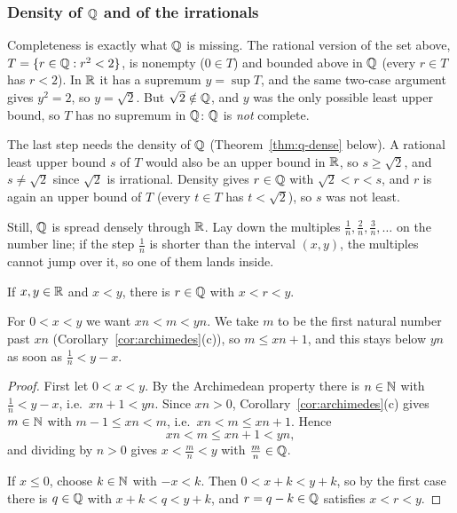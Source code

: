 \subsubsection*{Density of \texorpdfstring{$\Q$}{Q} and of the irrationals}
Completeness is exactly what $\Q$ is missing. The rational version of the
set above, $T = \{r \in \mathbb{Q} : r^2 < 2\}$, is nonempty ($0 \in T$) and bounded
above in $\Q$ (every $r \in T$ has $r < 2$). In $\mathbb{R}$ it has a supremum
$y = \sup T$, and the same two-case argument gives $y^2 = 2$, so
$y = \sqrt{2}$. But $\sqrt{2} \notin \mathbb{Q}$, and $y$ was the only possible
least upper bound, so $T$ has no supremum in $\Q$: $\Q$ is \emph{not}
complete.
\begin{own}
  The last step needs the density of $\Q$ (Theorem~\ref{thm:q-dense} below).
  A rational least upper bound $s$ of $T$ would also be an upper bound in
  $\mathbb{R}$, so $s \geq \sqrt{2}$, and $s \neq \sqrt{2}$ since $\sqrt 2$ is
  irrational. Density gives $r \in \mathbb{Q}$ with $\sqrt{2} < r < s$, and $r$ is
  again an upper bound of $T$ (every $t \in T$ has $t < \sqrt{2}$), so $s$ was
  not least.
\end{own}

Still, $\Q$ is spread densely through $\mathbb{R}$. Lay down the multiples
$\frac{1}{n}, \frac{2}{n}, \frac{3}{n}, \ldots$ on the number line; if the
step $\frac{1}{n}$ is shorter than the interval $(x, y)$, the multiples
cannot jump over it, so one of them lands inside.

\begin{nthm}[Density of $\Q$]\label{thm:q-dense}
  If $x, y \in \mathbb{R}$ and $x < y$, there is $r \in \mathbb{Q}$ with $x < r < y$.
\end{nthm}
For $0 < x < y$ we want $xn < m < yn$. We take $m$ to be the first natural
number past $xn$ (Corollary~\ref{cor:archimedes}(c)), so $m \leq xn + 1$, and
this stays below $yn$ as soon as $\frac{1}{n} < y - x$.

\begin{proof}
  First let $0 < x < y$. By the Archimedean property there is $n \in \mathbb{N}$
  with $\frac{1}{n} < y - x$, i.e.\ $xn + 1 < yn$. Since $xn > 0$,
  Corollary~\ref{cor:archimedes}(c) gives $m \in \mathbb{N}$ with
  $m - 1 \leq xn < m$, i.e.\ $xn < m \leq xn + 1$. Hence
  \[
    xn < m \leq xn + 1 < yn,
  \]
  and dividing by $n > 0$ gives $x < \frac{m}{n} < y$ with
  $\frac{m}{n} \in \mathbb{Q}$.

  If $x \leq 0$, choose $k \in \mathbb{N}$ with $-x < k$. Then $0 < x + k < y + k$,
  so by the first case there is $q \in \mathbb{Q}$ with $x + k < q < y + k$, and
  $r = q - k \in \mathbb{Q}$ satisfies $x < r < y$.
\end{proof}

